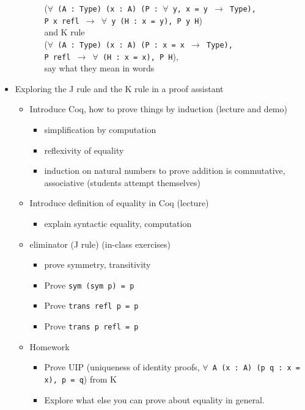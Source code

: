 \documentclass{article}
\begin{document}
\begin{itemize}
\begin{itemize}
\begin{itemize}
          (\texttt{$\forall$~(A~:~Type) (x~:~A) (P~:~$\forall$ y, x = y $\to$ Type), \\ P x refl $\to$ $\forall$~y (H~:~x = y), P y H}) \\
          and K rule \\
          (\texttt{$\forall$~(A~:~Type) (x~:~A) (P~:~x = x $\to$ Type), \\ P refl $\to$ $\forall$~(H~:~x~=~x), P H}), \\
          say what they mean in words
      \end{itemize}
    \end{itemize}
    \item Exploring the J rule and the K rule in a proof assistant
    \begin{itemize}
      \item Introduce Coq, how to prove things by induction (lecture and demo)
      \begin{itemize}
        \item simplification by computation
        \item reflexivity of equality
        \item induction on natural numbers to prove addition is commutative, associative (students attempt themselves)
      \end{itemize}
      \item Introduce definition of equality in Coq (lecture)
      \begin{itemize}
        \item explain syntactic equality, computation
      \end{itemize}
      \item eliminator (J rule) (in-class exercises)
      \begin{itemize}
        \item prove symmetry, transitivity
        \item Prove \texttt{sym (sym p) = p}
        \item Prove \texttt{trans refl p = p}
        \item Prove \texttt{trans p refl = p}
      \end{itemize}
      \item Homework
      \begin{itemize}
        \item Prove UIP (uniqueness of identity proofs, \texttt{$\forall$ A (x~:~A) (p q~:~x = x), p = q}) from K
        \item Explore what else you can prove about equality in general.

\end{itemize}
\end{itemize}
\end{itemize}
\end{document}
